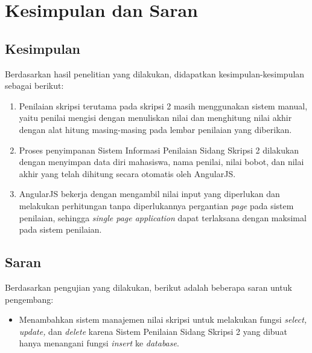 \chapter{Kesimpulan dan Saran}
\label{chap: kesimpulan}

\section{Kesimpulan}
\label{sec: kesimpulan}
	
	Berdasarkan hasil penelitian yang dilakukan, didapatkan kesimpulan-kesimpulan sebagai berikut:
	\begin{enumerate}
		\item Penilaian skripsi terutama pada skripsi 2 masih menggunakan sistem manual, yaitu penilai mengisi dengan menuliskan nilai dan menghitung nilai akhir dengan alat hitung masing-masing pada lembar penilaian yang diberikan.
		\item Proses penyimpanan Sistem Informasi Penilaian Sidang Skripsi 2 dilakukan dengan menyimpan data diri mahasiswa, nama penilai, nilai bobot, dan nilai akhir yang telah dihitung secara otomatis oleh AngularJS.
		\item AngularJS bekerja dengan mengambil nilai input yang diperlukan dan melakukan perhitungan tanpa diperlukannya pergantian \textit{page} pada sistem penilaian, sehingga \textit{single page application} dapat terlaksana dengan maksimal pada sistem penilaian.
	\end{enumerate}

\section{Saran}
\label{sec: saran}

	Berdasarkan pengujian yang dilakukan, berikut adalah beberapa saran untuk pengembang:
	\begin{itemize}
		\item Menambahkan sistem manajemen nilai skripsi untuk melakukan fungsi \textit{select, update,} dan \textit{delete} karena Sistem Penilaian Sidang Skripsi 2 yang dibuat hanya menangani fungsi \textit{insert} ke \textit{database}.
	\end{itemize}
	